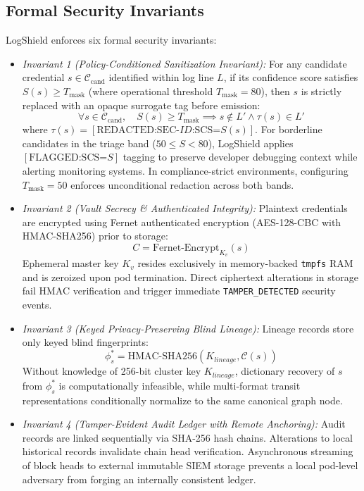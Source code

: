 \documentclass[conference]{IEEEtran}
\begin{document}
\subsection{Formal Security Invariants}
LogShield enforces six formal security invariants:
\begin{itemize}
    \item \textit{Invariant 1 (Policy-Conditioned Sanitization Invariant):} For any candidate credential $s \in \mathcal{C}_{\text{cand}}$ identified within log line $L$, if its confidence score satisfies $S(s) \ge T_{\text{mask}}$ (where operational threshold $T_{\text{mask}} = 80$), then $s$ is strictly replaced with an opaque surrogate tag before emission:
    \begin{equation}
        \forall s \in \mathcal{C}_{\text{cand}}, \quad S(s) \ge T_{\text{mask}} \implies s \notin L' \land \tau(s) \in L'
    \end{equation}
    where $\tau(s) = [\text{REDACTED:SEC-}ID\text{:SCS=}S(s)]$. For borderline candidates in the triage band ($50 \le S < 80$), LogShield applies $[\text{FLAGGED:SCS=}S]$ tagging to preserve developer debugging context while alerting monitoring systems. In compliance-strict environments, configuring $T_{\text{mask}} = 50$ enforces unconditional redaction across both bands.
    \item \textit{Invariant 2 (Vault Secrecy \& Authenticated Integrity):} Plaintext credentials are encrypted using Fernet authenticated encryption (AES-128-CBC with HMAC-SHA256) prior to storage:
    \begin{equation}
        C = \text{Fernet-Encrypt}_{K_v}(s)
    \end{equation}
    Ephemeral master key $K_v$ resides exclusively in memory-backed \texttt{tmpfs} RAM and is zeroized upon pod termination. Direct ciphertext alterations in storage fail HMAC verification and trigger immediate \texttt{TAMPER\_DETECTED} security events.
    \item \textit{Invariant 3 (Keyed Privacy-Preserving Blind Lineage):} Lineage records store only keyed blind fingerprints:
    \begin{equation}
        \phi_s^* = \text{HMAC-SHA256}(K_{lineage}, \mathcal{C}(s))
    \end{equation}
    Without knowledge of 256-bit cluster key $K_{lineage}$, dictionary recovery of $s$ from $\phi_s^*$ is computationally infeasible, while multi-format transit representations conditionally normalize to the same canonical graph node.
    \item \textit{Invariant 4 (Tamper-Evident Audit Ledger with Remote Anchoring):} Audit records are linked sequentially via SHA-256 hash chains. Alterations to local historical records invalidate chain head verification. Asynchronous streaming of block heads to external immutable SIEM storage prevents a local pod-level adversary from forging an internally consistent ledger.

\end{itemize}
\end{document}
